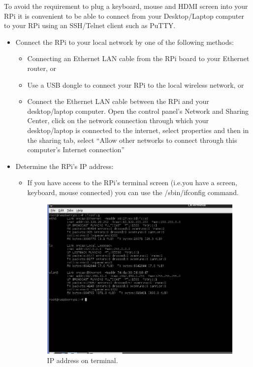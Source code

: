 \documentclass[a4paper,12pt,oneside]{book}
\begin{document}
To avoid the requirement to plug a keyboard, mouse and HDMI screen into your RPi it is convenient to be able to connect from your Desktop/Laptop computer to your RPi using an SSH/Telnet client such as PuTTY.
	 \begin{itemize}
	 	\item Connect the RPi to your local network by one of the following methods:
			\begin{itemize}
				\item Connecting an Ethernet LAN cable from the RPi board to your Ethernet router, or
				\item Use a USB dongle to connect your RPi to the local wireless network, or
				\item Connect the Ethernet LAN cable between the RPi and your desktop/laptop computer. Open the control panel’s Network and Sharing Center, click on the network connection through which your desktop/laptop is connected to the internet, select properties and then in the sharing tab, select “Allow other networks to connect through this computer’s Internet connection”
\end{itemize}
	\item Determine the RPi’s IP address:
	\begin{itemize}
		\item If you have access to the RPi’s terminal screen (i.e.you have a screen, keyboard, mouse connected) you can use the /sbin/ifconfig command.
			\begin{figure}[H]
				\centering
				\includegraphics[scale=0.37]{ip}
				\caption{IP address on terminal.}

\end{figure}
\end{itemize}
\end{itemize}
\end{document}
